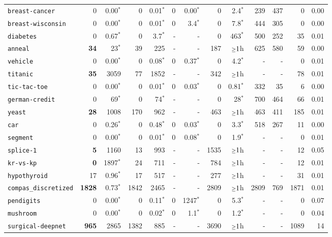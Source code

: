 \begin{tabular}{lrrrrrrrrrrrr}
\texttt{breast-cancer} & 0 & 0.00$^*$ & 0 & 0.01$^*$ & 0 & 0.00$^*$ & 0 & 2.4$^*$ & 239 & 437 & 0 & 0.00\\
\texttt{breast-wisconsin} & 0 & 0.00$^*$ & 0 & 0.01$^*$ & 0 & 3.4$^*$ & 0 & 7.8$^*$ & 444 & 305 & 0 & 0.00\\
\texttt{diabetes} & 0 & 0.67$^*$ & 0 & 3.7$^*$ & - & - & 0 & 463$^*$ & 500 & 252 & 35 & 0.01\\
\texttt{anneal} & \textbf{34} & 23$^*$ & 39 & 225 & - & - & 187 & $\mathsmaller{\geq}1$h & 625 & 580 & 59 & 0.00\\
\texttt{vehicle} & 0 & 0.00$^*$ & 0 & 0.08$^*$ & 0 & 0.37$^*$ & 0 & 4.2$^*$ & - & - & 0 & 0.01\\
\texttt{titanic} & \textbf{35} & 3059 & 77 & 1852 & - & - & 342 & $\mathsmaller{\geq}1$h & - & - & 78 & 0.01\\
\texttt{tic-tac-toe} & 0 & 0.00$^*$ & 0 & 0.01$^*$ & 0 & 0.03$^*$ & 0 & 0.81$^*$ & 332 & 35 & 6 & 0.00\\
\texttt{german-credit} & 0 & 69$^*$ & 0 & 74$^*$ & - & - & 0 & 28$^*$ & 700 & 464 & 66 & 0.01\\
\texttt{yeast} & \textbf{28} & 1008 & 170 & 962 & - & - & 463 & $\mathsmaller{\geq}1$h & 463 & 411 & 185 & 0.01\\
\texttt{car} & 0 & 0.26$^*$ & 0 & 0.48$^*$ & 0 & 0.03$^*$ & 0 & 3.3$^*$ & 518 & 267 & 11 & 0.00\\
\texttt{segment} & 0 & 0.00$^*$ & 0 & 0.01$^*$ & 0 & 0.08$^*$ & 0 & 1.9$^*$ & - & - & 0 & 0.01\\
\texttt{splice-1} & \textbf{5} & 1160 & 13 & 993 & - & - & 1535 & $\mathsmaller{\geq}1$h & - & - & 12 & 0.05\\
\texttt{kr-vs-kp} & \textbf{0} & 1897$^*$ & 24 & 711 & - & - & 784 & $\mathsmaller{\geq}1$h & - & - & 12 & 0.01\\
\texttt{hypothyroid} & 17 & 0.96$^*$ & 17 & 517 & - & - & 277 & $\mathsmaller{\geq}1$h & - & - & 31 & 0.01\\
\texttt{compas\_discretized} & \textbf{1828} & 0.73$^*$ & 1842 & 2465 & - & - & 2809 & $\mathsmaller{\geq}1$h & 2809 & 769 & 1871 & 0.01\\
\texttt{pendigits} & 0 & 0.00$^*$ & 0 & 0.11$^*$ & 0 & 1247$^*$ & 0 & 5.3$^*$ & - & - & 0 & 0.07\\
\texttt{mushroom} & 0 & 0.00$^*$ & 0 & 0.02$^*$ & 0 & 1.1$^*$ & 0 & 1.2$^*$ & - & - & 0 & 0.04\\
\texttt{surgical-deepnet} & \textbf{965} & 2865 & 1382 & 885 & - & - & 3690 & $\mathsmaller{\geq}1$h & - & - & 1089 & 14\\

\end{tabular}

